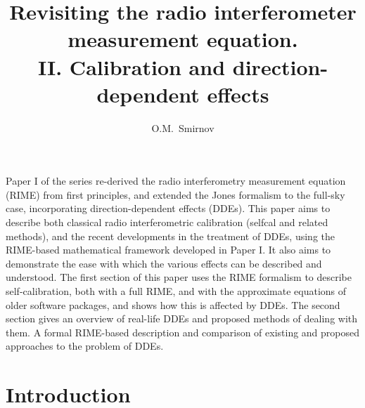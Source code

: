 \documentclass[referee]{aa}
\begin{document}
\title{Revisiting the radio interferometer measurement equation.\\II. Calibration and direction-dependent effects}

\author{O.M.\ Smirnov}


\date{}


\abstract%
{Paper I of the series re-derived the radio interferometry measurement equation (RIME) from first principles, and extended the Jones
formalism to the full-sky case, incorporating direction-dependent effects (DDEs).}
{This paper aims to describe both classical radio interferometric calibration (selfcal and related methods), and the
recent developments in the treatment of DDEs, using the RIME-based mathematical framework developed in Paper I. It also
aims to demonstrate the ease with which the various effects can be described and understood.}
{The first section of this paper uses the RIME formalism to describe self-calibration, both with 
a full RIME, and with the approximate equations of older software packages, and shows how this is affected 
by DDEs. The second section gives an overview of real-life DDEs and proposed methods of dealing with them.}
{A formal RIME-based description and comparison of existing and proposed approaches to the problem of DDEs.}
{}


\maketitle

\section*{Introduction}
\end{document}
